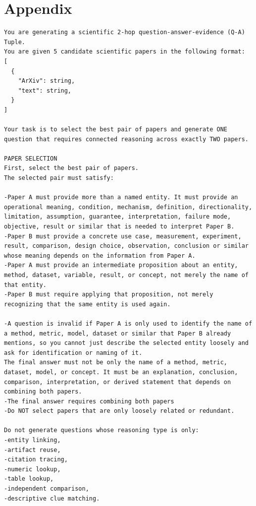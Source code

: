\chapter{Appendix}
\label{cha:Appendix}

\begin{lstlisting}[caption={Question–Answer generation prompt}, label={lst:questionAnswerGenerationPrompt}]
You are generating a scientific 2-hop question-answer-evidence (Q-A) Tuple.
You are given 5 candidate scientific papers in the following format: 
[
  {
    "ArXiv": string,
    "text": string,
  }
]

Your task is to select the best pair of papers and generate ONE question that requires connected reasoning across exactly TWO papers.

PAPER SELECTION
First, select the best pair of papers.
The selected pair must satisfy:

-Paper A must provide more than a named entity. It must provide an operational meaning, condition, mechanism, definition, directionality, limitation, assumption, guarantee, interpretation, failure mode, objective, result or similar that is needed to interpret Paper B.
-Paper B must provide a concrete use case, measurement, experiment, result, comparison, design choice, observation, conclusion or similar whose meaning depends on the information from Paper A.
-Paper A must provide an intermediate proposition about an entity, method, dataset, variable, result, or concept, not merely the name of that entity.
-Paper B must require applying that proposition, not merely recognizing that the same entity is used again.

-A question is invalid if Paper A is only used to identify the name of a method, metric, model, dataset or similar that Paper B already mentions, so you cannot just describe the selected entity loosely and ask for identification or naming of it.
The final answer must not be only the name of a method, metric, dataset, model, or concept. It must be an explanation, conclusion, comparison, interpretation, or derived statement that depends on combining both papers.
-The final answer requires combining both papers
-Do NOT select papers that are only loosely related or redundant.

Do not generate questions whose reasoning type is only:
-entity linking,
-artifact reuse,
-citation tracing,
-numeric lookup,
-table lookup,
-independent comparison,
-descriptive clue matching.


\end{lstlisting}

